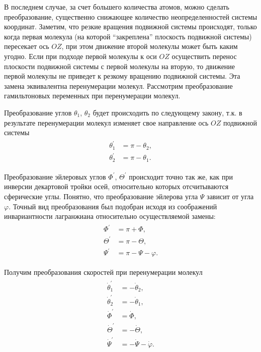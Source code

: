 В последнем случае, за счет большего количества атомов, можно сделать преобразование, существенно снижающее количество неопределенностей системы координат. Заметим, что резкие вращения подвижной системы происходят, только когда первая молекула (на которой \enquote{закреплена} плоскость подвижной системы) пересекает ось $OZ$, при этом движение второй молекулы может быть каким угодно. Если при подходе первой молекулы к оси $OZ$ осуществить перенос плоскости подвижной системы с первой молекулы на вторую, то движение первой молекулы не приведет к резкому вращению подвижной системы. Эта замена эквивалентна перенумерации молекул. Рассмотрим преобразование гамильтоновых переменных при перенумерации молекул. \par
Преобразование углов $\theta_1$, $\theta_2$ будет происходить по следующему закону, т.к. в результате перенумерации молекул изменяет свое направление ось $OZ$ подвижной системы
\begin{gather}
    \begin{aligned}
        \theta_1^\prime &= \pi - \theta_2, \\
        \theta_2^\prime &= \pi - \theta_1.
    \end{aligned}
\end{gather}

Преобразование эйлеровых углов $\Phi^\prime$, $\Theta^\prime$ происходит точно так же, как при инверсии декартовой тройки осей, относительно которых отсчитываются сферические углы. Понятно, что преобразование эйлерова угла $\Psi$ зависит от угла $\varphi$. Точный вид преобразования был подобран исходя из соображений инвариантности лагранжиана относительно осуществляемой замены:  
\begin{gather}
    \begin{aligned}
        \Phi^\prime &= \pi + \Phi, \\
        \Theta^\prime &= \pi - \Theta, \\
        \Psi^\prime &= \pi - \Psi - \varphi.
    \end{aligned}
\end{gather}

Получим преобразования скоростей при перенумерации молекул
\begin{gather}
    \begin{aligned}
        \dot{\theta}_1^\prime &= -\dot{\theta}_2, \\
        \dot{\theta}_2^\prime &= -\dot{\theta}_1, \\ 
        \dot{\Phi}^\prime &= \dot{\Phi}, \\
        \dot{\Theta}^\prime &= -\dot{\Theta}, \\
        \dot{\Psi}^\prime &= - \dot{\Psi} - \dot{\varphi}.
    \end{aligned} \label{polyatom-angles-exchange1}
\end{gather}

